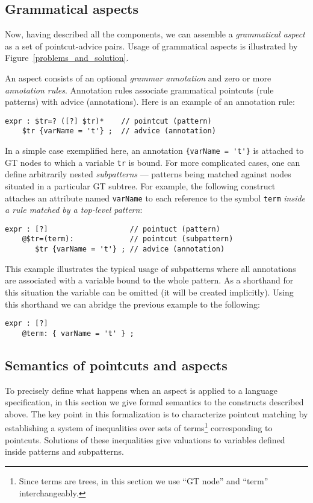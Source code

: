 \documentclass{IOS-Book-Article}     %
\newcommand{\figref}[1]{Figure~\ref{#1}}
\begin{document}
\subsection{Grammatical aspects}
Now, having described all the components, we can assemble a \emph{grammatical aspect} as a set of pointcut-advice pairs.
Usage of grammatical aspects is illustrated by \figref{problems_and_solution}.

An aspect consists of an optional \emph{grammar annotation} and zero or more \emph{annotation rules}. Annotation rules associate grammatical pointcuts (rule patterns) with advice (annotations). Here is an example of an annotation rule:
\begin{lstlisting}[language=Grammatic]
expr : $tr=? ([?] $tr)*    // pointcut (pattern)
    $tr {varName = 't'} ;  // advice (annotation)
\end{lstlisting}%
In a simple case exemplified here, an annotation \lstinline!{varName = 't'}! is attached to GT nodes to which a variable \texttt{tr} is bound.
For more complicated cases, one can define arbitrarily nested \emph{subpatterns} --- patterns being matched against nodes situated in a particular GT subtree. For example, the following construct attaches an attribute named \texttt{varName} to each reference to the symbol \texttt{term} \emph{inside a rule matched by a top-level pattern}:
\begin{lstlisting}[language=Grammatic]
expr : [?]                   // pointuct (pattern) 
    @$tr=(term):             // pointcut (subpattern)
       $tr {varName = 't'} ; // advice (annotation)
\end{lstlisting}
This example illustrates the typical usage of subpatterns where all annotations are associated with a variable bound to the whole pattern. As a shorthand for this situation the variable can be omitted (it will be created implicitly). Using this shorthand we can abridge the previous example to the following:
\begin{lstlisting}[language=Grammatic]
expr : [?]
    @term: { varName = 't' } ; 
\end{lstlisting}
%

\subsection{Semantics of pointcuts and aspects}

To precisely define what happens when an aspect is applied to a language specification, in this section we give formal semantics to the constructs described above. The key point in this formalization is to characterize pointcut matching by establishing a system of inequalities over sets of terms\footnote{Since terms are trees, in this section we use ``GT node'' and ``term'' interchangeably.} corresponding to pointcuts. Solutions of these inequalities give valuations to variables defined inside patterns and subpatterns.
\end{document}
